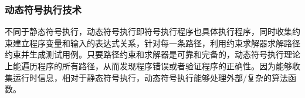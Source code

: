 
\subsubsection{动态符号执行技术}


不同于静态符号执行，动态符号执行即符号执行程序也具体执行程序，同时收集约束建立程序变量和输入的表达式关系，针对每一条路径，利用约束求解器求解路径约束并生成测试用例。只要路径约束和求解器是可靠和完备的，动态符号执行理论上能遍历程序的所有路径，从而发现程序错误或者验证程序的正确性。因为能够收集运行时信息，相对于静态符号执行，动态符号执行能够处理外部/复杂的算法函数。

